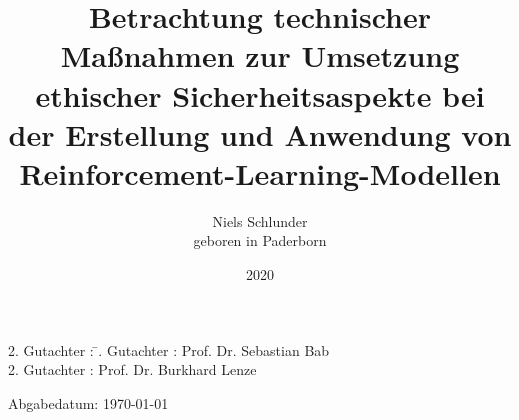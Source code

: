 


\newcommand{\thetitle}{Betrachtung technischer Maßnahmen zur Umsetzung ethischer Sicherheitsaspekte bei der Erstellung und Anwendung von Reinforcement-Learning-Modellen}
\newcommand{\Jahr}{2020}
\newcommand{\Geburtsort}{Paderborn}
\newcommand{\Lehrstuhl}{Experimentelle Physik V}
\newcommand{\Betreuer}{Prof. Dr. Sebastian Bab}
\newcommand{\Zweitgutachter}{Prof. Dr. Burkhard Lenze }
\newcommand{\Abgabedatum}{\today}


\author{
    Niels Schlunder\\
    geboren in \Geburtsort
}

\titlehead{
    \texttt{[image: logos/FH\_Dortmund-logo.pdf]}
}
\title{\thetitle}
\date{\Jahr}

\publishers{Praktische Informatik \\ Fachbereich Informatik \\ Fachhochschule Dortmund}




\frontmatter
\maketitle
\thispagestyle{empty}
\vspace*{\fill}
\begin{tabbing}
2. Gutachter : \=. Gutachter : \> \Betreuer \\[11pt]
2. Gutachter : \> \Zweitgutachter \\[11pt]
\end{tabbing}
\vspace{11pt}
Abgabedatum: \Abgabedatum
\newpage

\renewcommand{\baselinestretch}{1.5}\normalsize

\tableofcontents

\mainmatter










